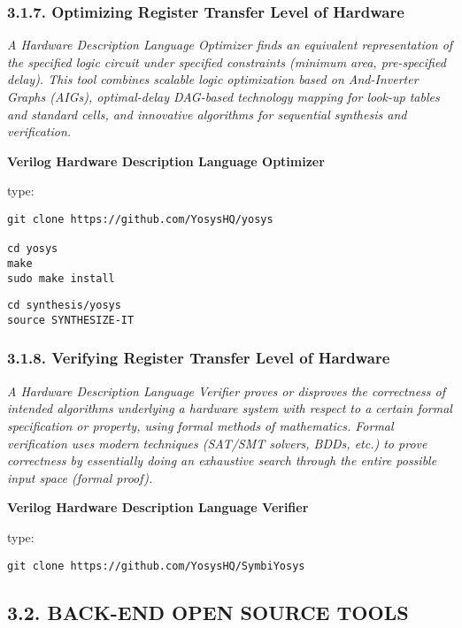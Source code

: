 \documentclass[]{article}
\begin{document}
\subsubsection{3.1.7. Optimizing Register Transfer Level of
Hardware}\label{optimizing-register-transfer-level-of-hardware}

\emph{A Hardware Description Language Optimizer finds an equivalent
representation of the specified logic circuit under specified
constraints (minimum area, pre-specified delay). This tool combines
scalable logic optimization based on And-Inverter Graphs (AIGs),
optimal-delay DAG-based technology mapping for look-up tables and
standard cells, and innovative algorithms for sequential synthesis and
verification.}

\textbf{Verilog Hardware Description Language Optimizer}

type:

\begin{verbatim}
git clone https://github.com/YosysHQ/yosys

cd yosys
make
sudo make install
\end{verbatim}

\begin{verbatim}
cd synthesis/yosys
source SYNTHESIZE-IT
\end{verbatim}

\subsubsection{3.1.8. Verifying Register Transfer Level of
Hardware}\label{verifying-register-transfer-level-of-hardware}

\emph{A Hardware Description Language Verifier proves or disproves the
correctness of intended algorithms underlying a hardware system with
respect to a certain formal specification or property, using formal
methods of mathematics. Formal verification uses modern techniques
(SAT/SMT solvers, BDDs, etc.) to prove correctness by essentially doing
an exhaustive search through the entire possible input space (formal
proof).}

\textbf{Verilog Hardware Description Language Verifier}

type:

\begin{verbatim}
git clone https://github.com/YosysHQ/SymbiYosys
\end{verbatim}

\subsection{3.2. BACK-END OPEN SOURCE
TOOLS}\label{back-end-open-source-tools}
\end{document}
